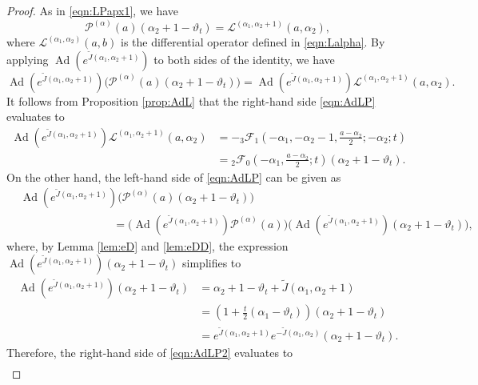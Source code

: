 \documentclass[a4paper,11pt,reqno]{amsart}
\newcommand{\calF}{\mathcal{F}}
\newcommand{\calL}{\mathcal{L}}
\newcommand{\calP}{\mathcal{P}}
\newcommand{\0}{{\bf 0}}
\newcommand{\1}{{\bf 1}}
\DeclareMathOperator{\Ad}{Ad}
\theoremstyle{plain}
\theoremstyle{definition}
\numberwithin{equation}{section}
\theoremstyle{definition}
\begin{document}
\begin{appendices}
\begin{proof}
As in \eqref{eqn:LPapx1}, we have 
\begin{equation*}
\calP^{(\alpha)}(a)(\alpha_2+1-\vartheta_t)
=
\calL^{(\alpha_1,\alpha_2+1)}(a,\alpha_2),
\end{equation*}
where $\calL^{(\alpha_1,\alpha_2)}(a,b)$ is the differential operator defined in 
\eqref{eqn:Lalpha}. By applying $\Ad(e^{\widetilde{J}(\alpha_1,\alpha_2+1)})$
to both sides of the identity, we have 
\begin{equation}\label{eqn:AdLP}
\Ad(e^{\widetilde{J}(\alpha_1,\alpha_2+1)}) 
\big(\calP^{(\alpha)}(a)(\alpha_2+1-\vartheta_t)\big)
=
\Ad(e^{\widetilde{J}(\alpha_1,\alpha_2+1)})
\calL^{(\alpha_1,\alpha_2+1)}(a,\alpha_2).
\end{equation}
It follows from Proposition \ref{prop:AdL} that the right-hand side \eqref{eqn:AdLP}
evaluates to 
\begin{align}
\Ad(e^{\widetilde{J}(\alpha_1,\alpha_2+1)})\calL^{(\alpha_1,\alpha_2+1)}(a,\alpha_2)
&=
- {}_3\calF_1(-\alpha_1,-\alpha_2-1,\tfrac{a-\alpha_2}{2};-\alpha_2;t) \nonumber\\[3pt]
&=
{}_2\calF_0(-\alpha_1,\tfrac{a-\alpha_2}{2};t)(\alpha_2+1-\vartheta_t).
\label{eqn:Ad2F0}
\end{align}
On the other hand, the left-hand side of \eqref{eqn:AdLP} can be given as
\begin{align}
&\Ad(e^{\widetilde{J}(\alpha_1,\alpha_2+1)}) 
\big(\calP^{(\alpha)}(a)(\alpha_2+1-\vartheta_t)\big) \nonumber\\
&
\hspace{100pt}
=
\Big(\Ad(e^{\tilde{J}(\alpha_1,\alpha_2+1)})\calP^{(\alpha)}(a)\Big)\Big(\Ad(e^{\tilde{J}(\alpha_1,\alpha_2+1)})(\alpha_2+1-\vartheta_t)\Big),\label{eqn:AdLP2}
\end{align}
where, by Lemma \ref{lem:eD} and \ref{lem:eDD}, 
the expression $\Ad(e^{\tilde{J}(\alpha_1,\alpha_2+1)})(\alpha_2+1-\vartheta_t)$
simplifies to
\begin{align*}
\Ad(e^{\tilde{J}(\alpha_1,\alpha_2+1)})(\alpha_2+1-\vartheta_t)&=\alpha_2+1-\vartheta_t+\tilde{J}(\alpha_1,\alpha_2+1)\\
&=(1+\tfrac{t}{2}(\alpha_1-\vartheta_t))(\alpha_2+1-\vartheta_t)\\
&=e^{\tilde{J}(\alpha_1,\alpha_2+1)}e^{-\tilde{J}(\alpha_1,\alpha_2)}(\alpha_2+1-\vartheta_t).
\end{align*}
Therefore, the right-hand side of \eqref{eqn:AdLP2} evaluates to
\begin{align}

\end{align}
\end{proof}
\end{appendices}
\end{document}

